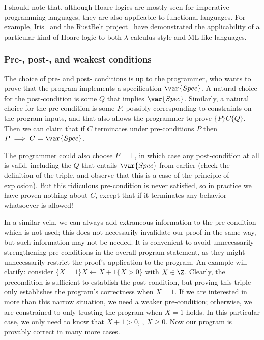 I should note that, although Hoare logics are mostly seen for imperative
programming languages, they are also applicable to functional languages. For
example, Iris~\cite[\S 5.1]{Krebbers_2017b} and the RustBelt project~\cite[\S
3.2, esp. \figurename~3]{Jung_2018a} have demonstrated the applicability of a
particular kind of Hoare logic to both \(\lambda\)-calculus style and ML-like
languages.

\subsubsection{Pre-, post-, and weakest conditions}

The choice of pre- and post- conditions is up to the programmer, who wants to
prove that the program implements a specification \(\var{Spec}\). A natural
choice for the post-condition is some \(Q\) that implies \(\var{Spec}\).
Similarly, a natural choice for the pre-condition is some \(P\), possibly
corresponding to constraints on the program inputs, and that also allows the
programmer to prove \(\{P\} C \{Q\}\). Then we can claim that if \(C\)
terminates under pre-conditions \(P\) then \(P \implies C \models \var{Spec}\).

The programmer could also choose \(P = \bot\), in which case any post-condition
at all is valid, including the \(Q\) that entails \(\var{Spec}\) from earlier
(check the definition of the triple, and observe that this is a case of the
principle of explosion). But this ridiculous pre-condition is never satisfied,
so in practice we have proven nothing about \(C\), except that if it terminates
any behavior whatsoever is allowed!

In a similar vein, we can always add extraneous information to the pre-condition
which is not used; this does not necessarily invalidate our proof in the same
way, but such information may not be needed. It is convenient to avoid
unnecessarily strengthening pre-conditions in the overall program statement, as
they might unnecessarily restrict the proof's application to the program. An
example will clarify: consider \(\{X = 1\}X \gets X + 1\{X > 0\}\) with \(X \in
\Z\). Clearly, the precondition is sufficient to establish the post-condition,
but proving this triple only establishes the program's correctness when \(X =
1\). If we are interested in more than this narrow situation, we need a weaker
pre-condition; otherwise, we are constrained to only trusting the program when
\(X = 1\) holds. In this particular case, we only need to know that \(X + 1 >
0\), \ie, \(X \ge 0\). Now our program is provably correct in many more cases.

